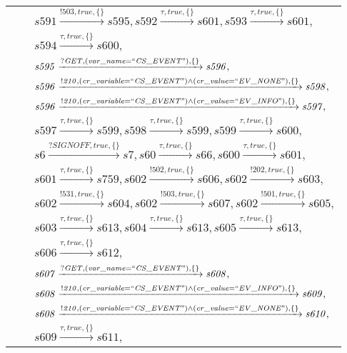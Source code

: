 \begin{tabular}{lcp{350px}}
& & $\mathit{s591}\xrightarrow{\mathit{!503}, \mathit{true}, \{\}}\mathit{s595},\mathit{s592}\xrightarrow{\mathit{\tau}, \mathit{true}, \{\}}\mathit{s601},\mathit{s593}\xrightarrow{\mathit{\tau}, \mathit{true}, \{\}}\mathit{s601},$ \\
& & $\mathit{s594}\xrightarrow{\mathit{\tau}, \mathit{true}, \{\}}\mathit{s600},$ \\
& & $\mathit{s595}\xrightarrow{\mathit{?GET}, \mathit{(var\_name = ``CS\_EVENT")}, \{\}}\mathit{s596},$ \\
& & $\mathit{s596}\xrightarrow{\mathit{!210}, \mathit{(cr\_variable = ``CS\_EVENT") \land (cr\_value = ``EV\_NONE")}, \{\}}\mathit{s598},$ \\
& & $\mathit{s596}\xrightarrow{\mathit{!210}, \mathit{(cr\_variable = ``CS\_EVENT") \land (cr\_value = ``EV\_INFO")}, \{\}}\mathit{s597},$ \\
& & $\mathit{s597}\xrightarrow{\mathit{\tau}, \mathit{true}, \{\}}\mathit{s599},\mathit{s598}\xrightarrow{\mathit{\tau}, \mathit{true}, \{\}}\mathit{s599},\mathit{s599}\xrightarrow{\mathit{\tau}, \mathit{true}, \{\}}\mathit{s600},$ \\
& & $\mathit{s6}\xrightarrow{\mathit{?SIGNOFF}, \mathit{true}, \{\}}\mathit{s7},\mathit{s60}\xrightarrow{\mathit{\tau}, \mathit{true}, \{\}}\mathit{s66},\mathit{s600}\xrightarrow{\mathit{\tau}, \mathit{true}, \{\}}\mathit{s601},$ \\
& & $\mathit{s601}\xrightarrow{\mathit{\tau}, \mathit{true}, \{\}}\mathit{s759},\mathit{s602}\xrightarrow{\mathit{!502}, \mathit{true}, \{\}}\mathit{s606},\mathit{s602}\xrightarrow{\mathit{!202}, \mathit{true}, \{\}}\mathit{s603},$ \\
& & $\mathit{s602}\xrightarrow{\mathit{!531}, \mathit{true}, \{\}}\mathit{s604},\mathit{s602}\xrightarrow{\mathit{!503}, \mathit{true}, \{\}}\mathit{s607},\mathit{s602}\xrightarrow{\mathit{!501}, \mathit{true}, \{\}}\mathit{s605},$ \\
& & $\mathit{s603}\xrightarrow{\mathit{\tau}, \mathit{true}, \{\}}\mathit{s613},\mathit{s604}\xrightarrow{\mathit{\tau}, \mathit{true}, \{\}}\mathit{s613},\mathit{s605}\xrightarrow{\mathit{\tau}, \mathit{true}, \{\}}\mathit{s613},$ \\
& & $\mathit{s606}\xrightarrow{\mathit{\tau}, \mathit{true}, \{\}}\mathit{s612},$ \\
& & $\mathit{s607}\xrightarrow{\mathit{?GET}, \mathit{(var\_name = ``CS\_EVENT")}, \{\}}\mathit{s608},$ \\
& & $\mathit{s608}\xrightarrow{\mathit{!210}, \mathit{(cr\_variable = ``CS\_EVENT") \land (cr\_value = ``EV\_INFO")}, \{\}}\mathit{s609},$ \\
& & $\mathit{s608}\xrightarrow{\mathit{!210}, \mathit{(cr\_variable = ``CS\_EVENT") \land (cr\_value = ``EV\_NONE")}, \{\}}\mathit{s610},$ \\
& & $\mathit{s609}\xrightarrow{\mathit{\tau}, \mathit{true}, \{\}}\mathit{s611},$ \\
\end{tabular}

